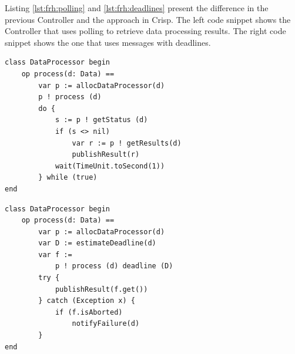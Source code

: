 Listing \ref{lst:frh:polling} and \ref{lst:frh:deadlines} present the difference in the previous Controller and the approach in Crisp.
The left code snippet shows the Controller that uses polling to retrieve data processing results.
The right code snippet shows the one that uses messages with deadlines.
\begin{center}
\begin{minipage}[t]{0.48\textwidth}
\vspace{-25pt}
\begin{lstlisting}[label=lst:frh:polling, caption=With polling]
class DataProcessor begin
	op process(d: Data) ==
		var p := allocDataProcessor(d)
		p ! process (d)
		do {
			s := p ! getStatus (d)
			if (s <> nil)
				var r := p ! getResults(d)
				publishResult(r)
			wait(TimeUnit.toSecond(1))
		} while (true)
end
\end{lstlisting}
\end{minipage}
\hfill
\begin{minipage}[t]{0.48\textwidth}
\vspace{-25pt}
\begin{lstlisting}[label=lst:frh:deadlines, caption=With deadlines]
class DataProcessor begin
	op process(d: Data) == 
		var p := allocDataProcessor(d)
		var D := estimateDeadline(d)
		var f := 
			p ! process (d) deadline (D)
		try {
			publishResult(f.get())
		} catch (Exception x) {
			if (f.isAborted)
				notifyFailure(d)
		}
end 
\end{lstlisting}
\end{minipage}
\vspace{-10pt}
\end{center}




